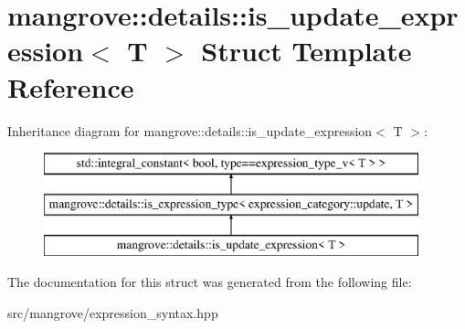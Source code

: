 \hypertarget{structmangrove_1_1details_1_1is__update__expression}{}\section{mangrove\+:\+:details\+:\+:is\+\_\+update\+\_\+expression$<$ T $>$ Struct Template Reference}
\label{structmangrove_1_1details_1_1is__update__expression}
Inheritance diagram for mangrove\+:\+:details\+:\+:is\+\_\+update\+\_\+expression$<$ T $>$\+:\begin{figure}[H]
\begin{center}
\leavevmode
\includegraphics[height=3.000000cm]{structmangrove_1_1details_1_1is__update__expression}
\end{center}
\end{figure}


The documentation for this struct was generated from the following file\+:\begin{DoxyCompactItemize}
\item 
src/mangrove/expression\+\_\+syntax.\+hpp\end{DoxyCompactItemize}
